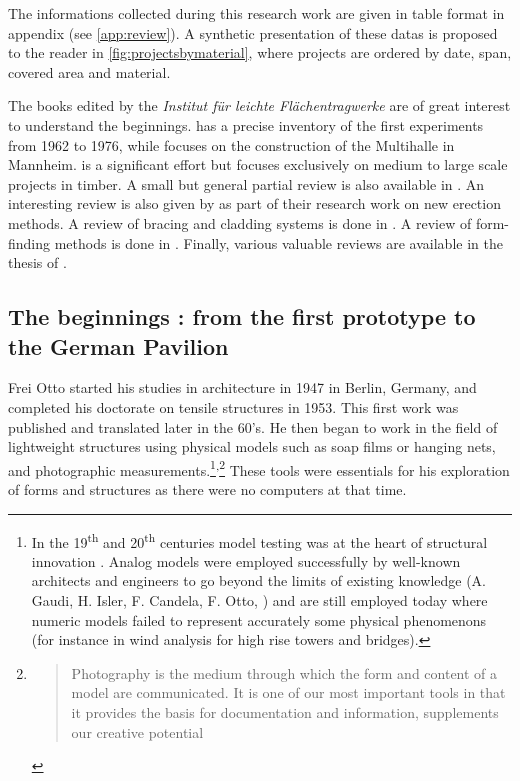 The informations collected during this research work are given in table format in appendix (see \cref{app:review}). A synthetic presentation of these datas is proposed to the reader in \cref{fig:projectsbymaterial}, where projects are ordered by date, span, covered area and material.

The books edited by the \emph{Institut für leichte Flächentragwerke} are of great interest to understand the beginnings.  \cite{IL10} has a precise inventory of the first experiments from 1962 to 1976, while  \cite{IL13} focuses on the construction of the Multihalle in Mannheim.  \cite{Chilton2017} is a significant effort but focuses exclusively on medium to large scale projects in timber. A small but general partial review is also available in \cite{Collins2016}. An interesting review is also given by \citet{Quinn2014} as part of their research work on new erection methods. A review of bracing and cladding systems is done in \cite{Cuvilliers2017}. A review of form-finding methods is done in \cite{Vaulot2016}. Finally, various valuable reviews are available in the thesis of \citet{Douthe2007,Bouhaya2010,Tayeb2015a,Lafuente2015}.


\subsection{The beginnings : from the first prototype to the German Pavilion}
Frei Otto started his studies in architecture in 1947 in Berlin, Germany, and completed his doctorate on tensile structures in 1953. This first work was published and translated later in the 60's. He then began to work in the field of lightweight structures using physical models such as soap films or hanging nets, and photographic measurements.\footnote{In the 19\textsuperscript{th} and 20\textsuperscript{th} centuries model testing was at the heart of structural innovation \cite{Addis2013}. Analog models were employed successfully by well-known architects and engineers to go beyond the limits of existing knowledge (A. Gaudi, H. Isler, F. Candela, F. Otto, \telp{}) and are still employed today where numeric models failed to represent accurately some physical phenomenons (for instance in wind analysis for high rise towers and bridges).}\textsuperscript{,}\footnote{\blockcquote[p.~56]{IL10}{Photography is the medium through which the form and content of a model are communicated. It is one of our most important tools in that it provides the basis for documentation and information, supplements our creative potential \belp{} }} These tools were essentials for his exploration of forms and structures as there were no computers at that time.

